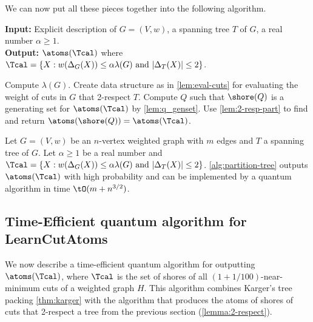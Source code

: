 We can now put all these pieces together into the following algorithm.
\begin{algorithm}[H]
\caption{Algorithm for finding atoms of the shores of 2-respecting near-minimum cuts}
\label{alg:partition-tree}
 \hspace*{\algorithmicindent} \textbf{Input:} Explicit description of $G=(V,w)$, a spanning tree $T$ of $G$, a real number $\alpha \ge 1$. \\
 \hspace*{\algorithmicindent} \textbf{Output:} $\atoms(\Tcal)$ where $\Tcal = \{X: w(\Delta_G(X)) \le \alpha \lambda(G) \mbox{ and } |\Delta_T(X)| \le 2\}$.
\begin{algorithmic}[1]
\State
Compute $\lambda(G)$.
\State
Create data structure as in \cref{lem:eval-cuts} for evaluating the weight of cuts in $G$ that 2-respect $T$.
\State
Compute $Q$ such that $\shore(Q)$ is a generating set for $\atoms(\Tcal)$ by \cref{lem:q_genset}.
\State
Use \cref{lem:2-resp-part} to find and return $\atoms(\shore(Q)) = \atoms(\Tcal)$.
\end{algorithmic}
\end{algorithm}

\begin{lemma} \label{lemma:2-respect}
Let $G=(V,w)$ be an $n$-vertex weighted graph with $m$ edges and $T$ a spanning tree of $G$.  Let $\alpha \ge 1$ be a real number and
$\Tcal = \{X: w(\Delta_G(X)) \le \alpha \lambda(G) \mbox{ and } |\Delta_T(X)| \le 2\}$.  
\cref{alg:partition-tree} outputs $\atoms(\Tcal)$ with high probability and can be implemented by a quantum algorithm in time $\tO(m + n^{3/2})$.
\end{lemma}

\subsection{Time-Efficient quantum algorithm for LearnCutAtoms}
We now describe a time-efficient quantum algorithm for outputting $\atoms(\Tcal)$, where $\Tcal$ is the set of shores of all $(1+1/100)$-near-minimum cuts of a weighted graph $H$.
This algorithm combines Karger's tree packing \cref{thm:karger} with the algorithm that produces the atoms of shores of cuts that 2-respect a tree from the previous section (\cref{lemma:2-respect}).

